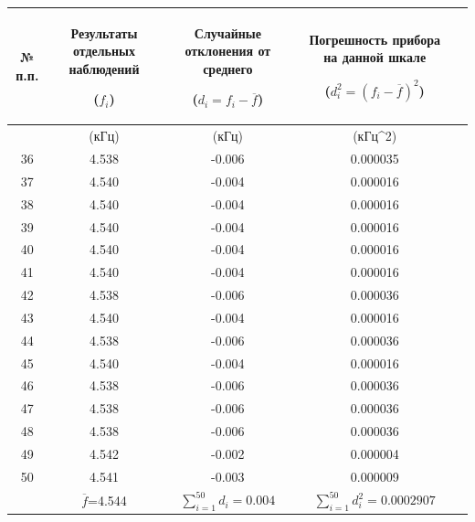 \begin{center}
\label{tabl:1}
\begin{tabular}{|c|c|c|c|c|}
\hline
\begin{minipage}{7mm}
    № п.п. 
\end{minipage}&
\begin{minipage}{5cm}
    Результаты отдельных наблюдений 
    
    ($f_i$)
\end{minipage} &
\begin{minipage}{5cm}
    Случайные отклонения от среднего
    
    ($d_i = f_i - \overline{f}$)
\end{minipage} &
\begin{minipage}{5cm}
    Погрешность прибора на данной шкале
    
    ($d_i^2 = (f_i - \overline{f})^2$)
\end{minipage}\\
\hline
{}&(кГц)&(кГц)&(кГц^2)\\
\hline
36 &	4.538  &  -0.006 & 0.000035 \\
37 &	4.540  &  -0.004 & 0.000016 \\
38 &	4.540  &  -0.004 & 0.000016 \\
39 &	4.540  &  -0.004 & 0.000016 \\
40 &	4.540  &  -0.004 & 0.000016 \\
41 &	4.540  &  -0.004 & 0.000016 \\
42 &	4.538  &  -0.006 & 0.000036 \\
43 &	4.540  &  -0.004 & 0.000016 \\
44 &	4.538  &  -0.006 & 0.000036 \\
45 &	4.540  &  -0.004 & 0.000016 \\
46 &	4.538  &  -0.006 & 0.000036 \\
47 &	4.538  &  -0.006 & 0.000036 \\
48 &	4.538  &  -0.006 & 0.000036 \\
49 &	4.542  &  -0.002 & 0.000004 \\
50 &	4.541  &  -0.003 & 0.000009 \\
\hline
   & $\overline{f}$=4.544 & $\sum_{i=1}^{50} d_i=0.004$ & $\sum_{i=1}^{50}d_i^2=0.0002907$\\
\hline
\end{tabular}
\end{center}

